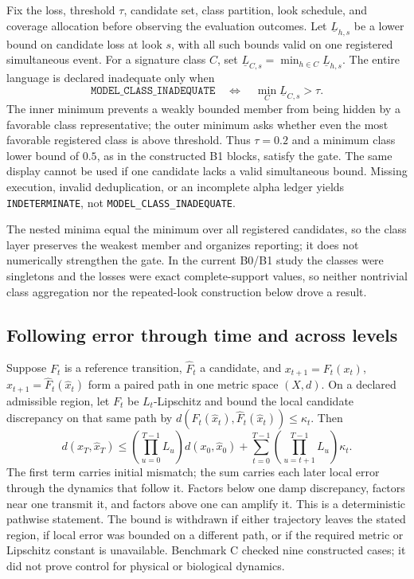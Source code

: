 \documentclass[10pt]{article}
\newcommand{\classbad}{\texttt{MODEL\_CLASS\_INADEQUATE}}
\theoremstyle{definition}
\begin{document}
Fix the loss, threshold \(\tau\), candidate set, class partition, look schedule, and coverage
allocation before observing the evaluation outcomes. Let \(\underline L_{h,s}\) be a lower bound
on candidate loss at look \(s\), with all such bounds valid on one registered simultaneous event. For a
signature class \(C\), set \(\underline L_{C,s}=\min_{h\in C}\underline L_{h,s}\). The entire
language is declared inadequate only when
\begin{equation}
\classbad
\quad\Longleftrightarrow\quad
\min_C\underline L_{C,s}>\tau.
\label{eq:inadequacy}
\end{equation}
The inner minimum prevents a weakly bounded member from being hidden by a favorable class
representative; the outer minimum asks whether even the most favorable registered class is above threshold. Thus
\(\tau=0.2\) and a minimum class lower bound of \(0.5\), as in the constructed B1 blocks, satisfy
the gate. The same display cannot be used if one candidate lacks a valid simultaneous bound.
Missing execution, invalid deduplication, or an incomplete alpha ledger yields
\texttt{INDETERMINATE}, not \classbad.

The nested minima equal the minimum over all registered candidates, so the class layer preserves
the weakest member and organizes reporting; it does not numerically strengthen the gate. In the
current B0/B1 study the classes were singletons and the losses were exact complete-support values,
so neither nontrivial class aggregation nor the repeated-look construction below drove a result.

\subsection{Following error through time and across levels}

Suppose \(F_t\) is a reference transition, \(\widehat F_t\) a candidate, and
\(x_{t+1}=F_t(x_t)\), \(\widehat x_{t+1}=\widehat F_t(\widehat x_t)\) form a paired path in one
metric space \((X,d)\). On a declared admissible region, let \(F_t\) be \(L_t\)-Lipschitz and bound
the local candidate discrepancy on that same path by
\(d(F_t(\widehat x_t),\widehat F_t(\widehat x_t))\le\kappa_t\). Then
\begin{equation}
d(x_T,\widehat x_T)
\le
\left(\prod_{u=0}^{T-1}L_u\right)d(x_0,\widehat x_0)
+\sum_{t=0}^{T-1}
\left(\prod_{u=t+1}^{T-1}L_u\right)\kappa_t.
\label{eq:path}
\end{equation}
The first term carries initial mismatch; the sum carries each later local error through the
dynamics that follow it. Factors below one damp discrepancy, factors near one transmit it, and
factors above one can amplify it. This is a deterministic pathwise statement. The bound is
withdrawn if either trajectory leaves the stated region, if local error was bounded on a
different path, or if the required metric or
Lipschitz constant is unavailable. Benchmark C checked nine constructed cases; it did not prove
control for physical or biological dynamics.
\end{document}
